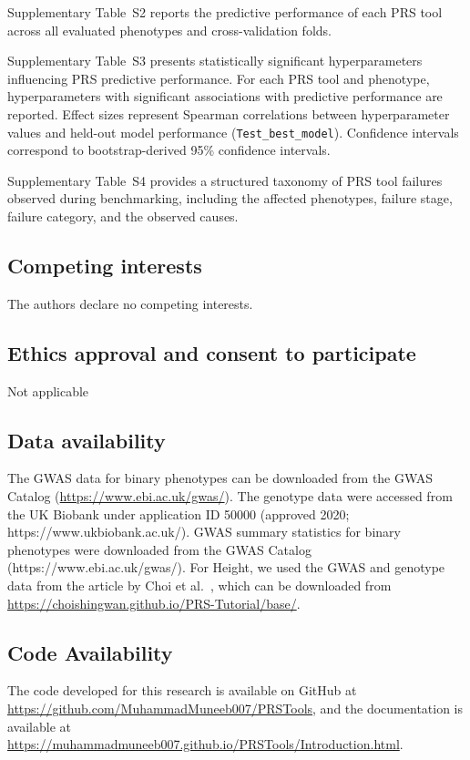 \documentclass[pdflatex,sn-basic]{sn-jnl}
\begin{document}
Supplementary Table~S2 reports the predictive performance of each PRS tool across all evaluated phenotypes and cross-validation folds.

Supplementary Table~S3 presents statistically significant hyperparameters influencing PRS predictive performance. For each PRS tool and phenotype, hyperparameters with significant associations with predictive performance are reported. Effect sizes represent Spearman correlations between hyperparameter values and held-out model performance (\texttt{Test\_best\_model}). Confidence intervals correspond to bootstrap-derived 95\% confidence intervals.

Supplementary Table~S4 provides a structured taxonomy of PRS tool failures observed during benchmarking, including the affected phenotypes, failure stage, failure category, and the observed causes.

\subsection*{Competing interests}
The authors declare no competing interests.

\subsection*{Ethics approval and consent to participate}
Not applicable

\subsection*{Data availability }
The GWAS data for binary phenotypes can be downloaded from the GWAS Catalog (\url{https://www.ebi.ac.uk/gwas/}). The genotype data were accessed from the UK Biobank under application ID 50000 (approved 2020; https://www.ukbiobank.ac.uk/). GWAS summary statistics for binary phenotypes were downloaded from the GWAS Catalog (https://www.ebi.ac.uk/gwas/). For Height, we used the GWAS and genotype data from the article by Choi et al.~\cite{Choi2020}, which can be downloaded from \url{https://choishingwan.github.io/PRS-Tutorial/base/}.


\subsection*{Code Availability}
The code developed for this research is available on GitHub at \url{https://github.com/MuhammadMuneeb007/PRSTools}, and the documentation is available at \url{https://muhammadmuneeb007.github.io/PRSTools/Introduction.html}.
\end{document}

